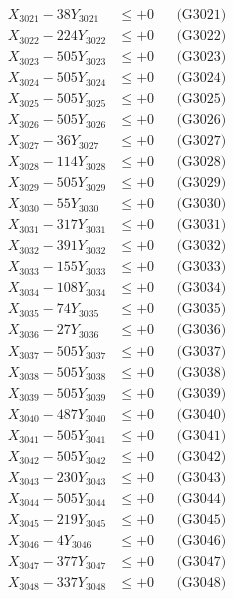 \documentclass[a4paper,10pt]{article}
\begin{document}
{\begin{align}
\allowbreak
X_{3021} - 38Y_{3021} &\leq +0 && \text{(G3021)} \\
X_{3022} - 224Y_{3022} &\leq +0 && \text{(G3022)} \\
X_{3023} - 505Y_{3023} &\leq +0 && \text{(G3023)} \\
X_{3024} - 505Y_{3024} &\leq +0 && \text{(G3024)} \\
X_{3025} - 505Y_{3025} &\leq +0 && \text{(G3025)} \\
X_{3026} - 505Y_{3026} &\leq +0 && \text{(G3026)} \\
X_{3027} - 36Y_{3027} &\leq +0 && \text{(G3027)} \\
X_{3028} - 114Y_{3028} &\leq +0 && \text{(G3028)} \\
X_{3029} - 505Y_{3029} &\leq +0 && \text{(G3029)} \\
X_{3030} - 55Y_{3030} &\leq +0 && \text{(G3030)} \\
\allowbreak
X_{3031} - 317Y_{3031} &\leq +0 && \text{(G3031)} \\
X_{3032} - 391Y_{3032} &\leq +0 && \text{(G3032)} \\
X_{3033} - 155Y_{3033} &\leq +0 && \text{(G3033)} \\
X_{3034} - 108Y_{3034} &\leq +0 && \text{(G3034)} \\
X_{3035} - 74Y_{3035} &\leq +0 && \text{(G3035)} \\
X_{3036} - 27Y_{3036} &\leq +0 && \text{(G3036)} \\
X_{3037} - 505Y_{3037} &\leq +0 && \text{(G3037)} \\
X_{3038} - 505Y_{3038} &\leq +0 && \text{(G3038)} \\
X_{3039} - 505Y_{3039} &\leq +0 && \text{(G3039)} \\
X_{3040} - 487Y_{3040} &\leq +0 && \text{(G3040)} \\
\allowbreak
X_{3041} - 505Y_{3041} &\leq +0 && \text{(G3041)} \\
X_{3042} - 505Y_{3042} &\leq +0 && \text{(G3042)} \\
X_{3043} - 230Y_{3043} &\leq +0 && \text{(G3043)} \\
X_{3044} - 505Y_{3044} &\leq +0 && \text{(G3044)} \\
X_{3045} - 219Y_{3045} &\leq +0 && \text{(G3045)} \\
X_{3046} - 4Y_{3046} &\leq +0 && \text{(G3046)} \\
X_{3047} - 377Y_{3047} &\leq +0 && \text{(G3047)} \\
X_{3048} - 337Y_{3048} &\leq +0 && \text{(G3048)} \\

\end{align}}
\end{document}
